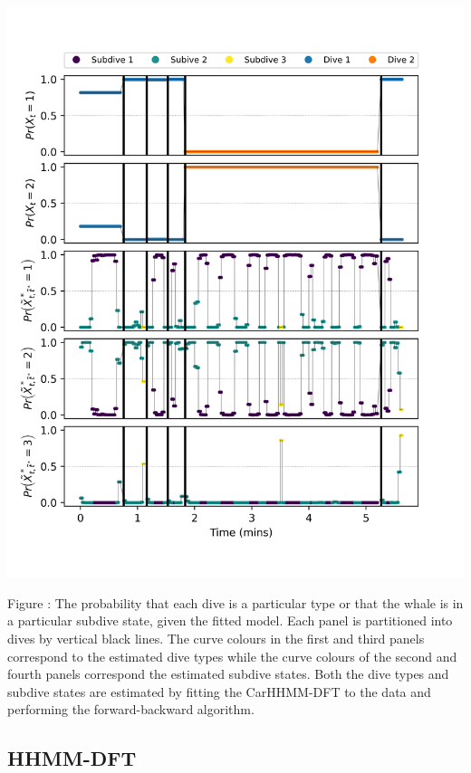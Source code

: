 \documentclass{article}
\begin{document}
        \begin{center}
        \includegraphics[width=6in]{../Plots/2019/20190902-182840-CATs_OB_1_0_267_CarHHMM2_decoded_states.png}
        \end{center}
        
        \noindent Figure : The probability that each dive is a particular type or that the whale is in a particular subdive state, given the fitted model. Each panel is partitioned into dives by vertical black lines. The curve colours in the first and third panels correspond to the estimated dive types while the curve colours of the second and fourth panels correspond the estimated subdive states. Both the dive types and subdive states are estimated by fitting the CarHHMM-DFT to the data and performing the forward-backward algorithm.
        \addtocounter{fignum}{1}
        
        \subsection{HHMM-DFT}
        
\end{document}

